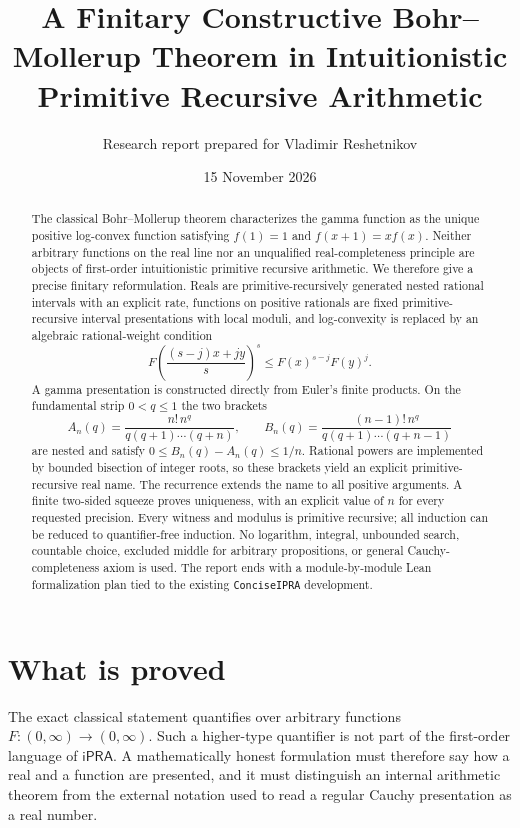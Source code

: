 \documentclass[11pt]{article}
\title{A Finitary Constructive Bohr--Mollerup Theorem in Intuitionistic Primitive Recursive Arithmetic}
\author{Research report prepared for Vladimir Reshetnikov}
\date{15 November 2026}
\newcommand{\ipra}{\mathsf{iPRA}}
\newcommand{\code}[1]{\texttt{#1}}
\begin{document}
\maketitle

\begin{abstract}
The classical Bohr--Mollerup theorem characterizes the gamma function as the
unique positive log-convex function satisfying $f(1)=1$ and
$f(x+1)=x f(x)$.  Neither arbitrary functions on the real line nor an
unqualified real-completeness principle are objects of first-order
intuitionistic primitive recursive arithmetic.  We therefore give a precise
finitary reformulation.  Reals are primitive-recursively generated nested
rational intervals with an explicit rate, functions on positive rationals are
fixed primitive-recursive interval presentations with local moduli, and
log-convexity is replaced by an algebraic rational-weight condition
\[
 F\!\left(\frac{(s-j)x+jy}{s}\right)^s
 \le F(x)^{s-j}F(y)^j.
\]
A gamma presentation is constructed directly from Euler's finite products.
On the fundamental strip $0<q\le1$ the two brackets
\[
 A_n(q)=\frac{n!\,n^q}{q(q+1)\cdots(q+n)},\qquad
 B_n(q)=\frac{(n-1)!\,n^q}{q(q+1)\cdots(q+n-1)}
\]
are nested and satisfy $0\le B_n(q)-A_n(q)\le1/n$.  Rational powers are
implemented by bounded bisection of integer roots, so these brackets yield an
explicit primitive-recursive real name.  The recurrence extends the name to
all positive arguments.  A finite two-sided squeeze proves uniqueness, with
an explicit value of $n$ for every requested precision.  Every witness and
modulus is primitive recursive; all induction can be reduced to
quantifier-free induction.  No logarithm, integral, unbounded search,
countable choice, excluded middle for arbitrary propositions, or general
Cauchy-completeness axiom is used.  The report ends with a module-by-module
Lean formalization plan tied to the existing \code{ConciseIPRA} development.
\end{abstract}

\tableofcontents

\section{What is proved}

The exact classical statement quantifies over arbitrary functions
$F:(0,\infty)\to(0,\infty)$.  Such a higher-type quantifier is not part of the
first-order language of $\ipra$.  A mathematically honest formulation must
therefore say how a real and a function are presented, and it must distinguish
an internal arithmetic theorem from the external notation used to read a
regular Cauchy presentation as a real number.
\end{document}
